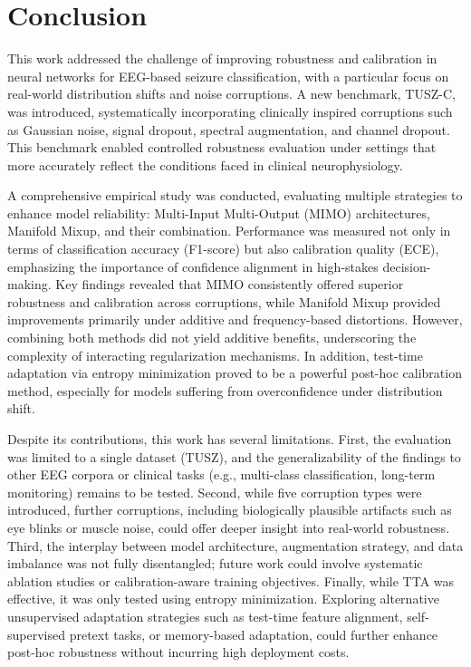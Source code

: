 
\chapter{Conclusion}
\label{ch:closure}
This work addressed the challenge of improving robustness and calibration in neural networks for EEG-based seizure classification, with a particular focus on real-world distribution shifts and noise corruptions. A new benchmark, TUSZ-C, was introduced, systematically incorporating clinically inspired corruptions such as Gaussian noise, signal dropout, spectral augmentation, and channel dropout. This benchmark enabled controlled robustness evaluation under settings that more accurately reflect the conditions faced in clinical neurophysiology. 

A comprehensive empirical study was conducted, evaluating multiple strategies to enhance model reliability: Multi-Input Multi-Output (MIMO) architectures, Manifold Mixup, and their combination. Performance was measured not only in terms of classification accuracy (F1-score) but also calibration quality (ECE), emphasizing the importance of confidence alignment in high-stakes decision-making. Key findings revealed that MIMO consistently offered superior robustness and calibration across corruptions, while Manifold Mixup provided improvements primarily under additive and frequency-based distortions. However, combining both methods did not yield additive benefits, underscoring the complexity of interacting regularization mechanisms. In addition, test-time adaptation via entropy minimization proved to be a powerful post-hoc calibration method, especially for models suffering from overconfidence under distribution shift.

Despite its contributions, this work has several limitations. First, the evaluation was limited to a single dataset (TUSZ), and the generalizability of the findings to other EEG corpora or clinical tasks (e.g., multi-class classification, long-term monitoring) remains to be tested. Second, while five corruption types were introduced, further corruptions, including biologically plausible artifacts such as eye blinks or muscle noise, could offer deeper insight into real-world robustness. Third, the interplay between model architecture, augmentation strategy, and data imbalance was not fully disentangled; future work could involve systematic ablation studies or calibration-aware training objectives. Finally, while TTA was effective, it was only tested using entropy minimization. Exploring alternative unsupervised adaptation strategies such as test-time feature alignment, self-supervised pretext tasks, or memory-based adaptation, could further enhance post-hoc robustness without incurring high deployment costs.